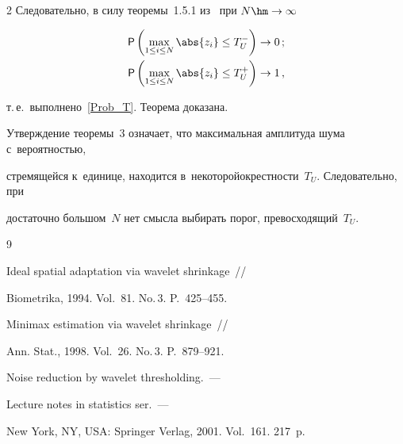 \begin{multicols}{2}
Следовательно, в силу теоремы~1.5.1 из~\cite{Lidb89} при $N\hm\to\infty$

\begin{align*}

{\sf P}\left(\max\limits_{1\leq i\leq N}\abs{z_i}\leq T^{-}_{U}\right)&\to 0\,;\\

{\sf P}\left(\max\limits_{1\leq i\leq N}\abs{z_i}\leq T^{+}_{U}\right)

&\to 1\,,

\end{align*}

т.\,е.\ выполнено~\eqref{Prob_T}. Теорема доказана.



\smallskip



Утверждение теоремы~3 означает, что макси\-маль\-ная амплитуда шума с~вероятностью, 

стре\-мящейся к~единице, находится в~некоторой\linebreak окрест\-ности~$T_U$. Следовательно, при 

достаточно большом~$N$ нет смысла выбирать порог, превосходящий~$T_U$.





{\small\frenchspacing

 {%


 \begin{thebibliography}{9}


 Ideal spatial adaptation via wavelet shrinkage~// 

Bio\-met\-ri\-ka, 1994. Vol.~81. No.\,3. P.~425--455.






 Minimax estimation via wavelet shrinkage~// 

Ann. Stat., 1998. Vol.~26. No.\,3. P.~879--921.




 Noise reduction by wavelet thresholding.~--- 

Lecture notes in statistics ser.~--- 

New York, NY, USA: Springer Verlag, 2001.  Vol.~161. 217~p.




\end{thebibliography}}}
\end{multicols}
